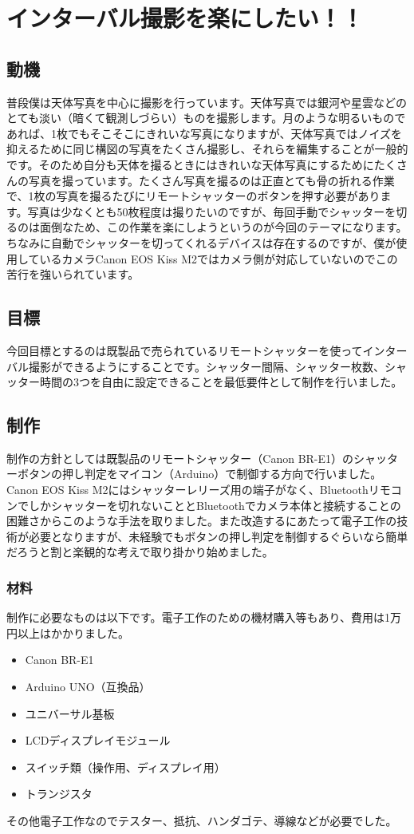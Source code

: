 \documentclass[../main]{subfiles}
\begin{document}
\chapter{インターバル撮影を楽にしたい！！} %
\section{動機}
普段僕は天体写真を中心に撮影を行っています。天体写真では銀河や星雲などのとても淡い（暗くて観測しづらい）ものを撮影します。月のような明るいものであれば、1枚でもそこそこにきれいな写真になりますが、天体写真ではノイズを抑えるために同じ構図の写真をたくさん撮影し、それらを編集することが一般的です。そのため自分も天体を撮るときにはきれいな天体写真にするためにたくさんの写真を撮っています。たくさん写真を撮るのは正直とても骨の折れる作業で、1枚の写真を撮るたびにリモートシャッターのボタンを押す必要があります。写真は少なくとも50枚程度は撮りたいのですが、毎回手動でシャッターを切るのは面倒なため、この作業を楽にしようというのが今回のテーマになります。ちなみに自動でシャッターを切ってくれるデバイスは存在するのですが、僕が使用しているカメラCanon EOS Kiss M2ではカメラ側が対応していないのでこの苦行を強いられています。

\section{目標}
今回目標とするのは既製品で売られているリモートシャッターを使ってインターバル撮影ができるようにすることです。シャッター間隔、シャッター枚数、シャッター時間の3つを自由に設定できることを最低要件として制作を行いました。

\section{制作}
制作の方針としては既製品のリモートシャッター（Canon BR-E1）のシャッターボタンの押し判定をマイコン（Arduino）で制御する方向で行いました。Canon EOS Kiss M2にはシャッターレリーズ用の端子がなく、Bluetoothリモコンでしかシャッターを切れないこととBluetoothでカメラ本体と接続することの困難さからこのような手法を取りました。また改造するにあたって電子工作の技術が必要となりますが、未経験でもボタンの押し判定を制御するぐらいなら簡単だろうと割と楽観的な考えで取り掛かり始めました。

\subsection{材料}
制作に必要なものは以下です。電子工作のための機材購入等もあり、費用は1万円以上はかかりました。
\begin{itemize}
\item Canon BR-E1
\item Arduino UNO（互換品）
\item ユニバーサル基板
\item LCDディスプレイモジュール
\item スイッチ類（操作用、ディスプレイ用）
\item トランジスタ
\end{itemize}
その他電子工作なのでテスター、抵抗、ハンダゴテ、導線などが必要でした。
\end{document}
